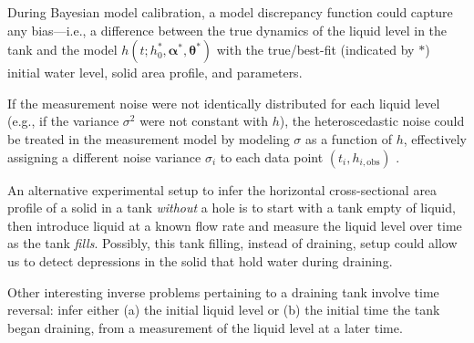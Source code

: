 \documentclass[a4paper,fleqn]{cas-dc}
\begin{document}
During Bayesian model calibration, a model discrepancy \cite{brynjarsdottir2014learning,kennedy2001bayesian,eugene2023learning} function could capture any bias---i.e., a difference between the true dynamics of the liquid level in the tank and the model $h(t; h_0^*,  \boldsymbol \alpha^*, \boldsymbol \theta^*)$ with the true/best-fit (indicated by $*$) initial water level, solid area profile, and parameters.

If the measurement noise were not identically distributed for each liquid level (e.g., if the variance $\sigma^2$ were not constant with $h$), the heteroscedastic noise could be treated in the measurement model by modeling $\sigma$ as a function of $h$, effectively assigning a different noise variance $\sigma_i$ to each data point $(t_i, h_{i, \text{obs}})$ \cite{minet2015bayesian,boscardin1994bayesian}. 

An alternative experimental setup to infer the horizontal cross-sectional area profile of a solid in a tank \emph{without} a hole is to start with a tank empty of liquid, then introduce liquid at a known flow rate and measure the liquid level over time as the tank \emph{fills}. Possibly, this tank filling, instead of draining, setup could allow us to detect depressions in the solid that hold water during draining.

Other interesting inverse problems pertaining to a draining tank involve time reversal: infer either (a) the initial liquid level or (b) the initial time the tank began draining, from a measurement of the liquid level at a later time.
\end{document}
